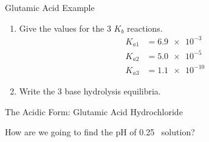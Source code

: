 \documentclass[notes=show]{beamer}
\begin{document}
\begin{frame}{Glutamic Acid Example}
\begin{overlayarea}{\textwidth}{13em}
\begin{enumerate}
		\item<4-> Give the values for the 3 $K_b$ reactions.
			\begin{align*}
				K_{a1} &= \num{6.9e-3} \\
				K_{a2} &= \num{5.0e-5} \\
				K_{a3} &= \num{1.1e-10}
			\end{align*}



		\item<5-> Write the 3 base hydrolysis equilibria.


	\end{enumerate}
	\end{overlayarea}
\end{frame}


\begin{frame}[t]{The Acidic Form: Glutamic Acid Hydrochloride}
	\begin{center}
		 \quad
	\end{center}

	How are we going to find the pH of \SI{0.25}{\Molar}~ solution?
\end{frame}

\end{document}
